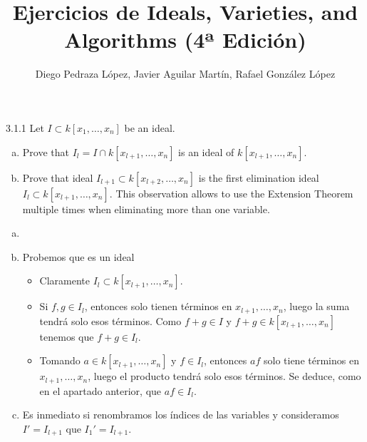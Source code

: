 \documentclass[twoside]{article}
\begin{document}
\title{Ejercicios de Ideals, Varieties, and Algorithms (4ª Edición)}
\author{Diego Pedraza López, Javier Aguilar Martín, Rafael González López}
\maketitle

\begin{ejercicio}{3.1.1}
Let $I\subset k[x_1,\dotsc,x_n]$ be an ideal.
\begin{enumerate}[a.]
\item Prove that $I_l = I\cap k[x_{l+1},\dotsc,x_n]$ is an ideal of $k[x_{l+1},\dotsc,x_n]$.
\item Prove that ideal $I_{l+1} \subset k[x_{l+2},\dotsc,x_n]$ is the first elimination ideal $I_l \subset k[x_{l+1},\dotsc,x_n]$. This observation allows to use the Extension Theorem multiple times when eliminating more than one variable.
\end{enumerate}
\end{ejercicio}
\begin{solucion}
\begin{enumerate}[a.]
\item[]
\item Probemos que es un ideal
\begin{itemize}
\item Claramente $I_l \subset k[x_{l+1},\dotsc,x_n]$.
\item Si $f,g\in I_l$, entonces solo tienen términos en $x_{l+1},\dotsc,x_n$, luego la suma tendrá solo esos términos. Como $f+g\in I$ y $f+g\in k[x_{l+1},\dotsc,x_n]$ tenemos que $f+g\in I_l$.
\item Tomando $a\in k[x_{l+1},\dotsc,x_n]$ y $f \in I_l$, entonces $af$ solo tiene términos en $x_{l+1},\dotsc,x_n$, luego el producto tendrá solo esos términos. Se deduce, como en el apartado anterior, que $af\in I_l$.
\end{itemize}
\item Es inmediato si renombramos los índices de las variables y consideramos $I'=I_{l+1}$ que $I_1'=I_{l+1}$.
\end{enumerate}
\end{solucion}

\newpage
\end{document}
